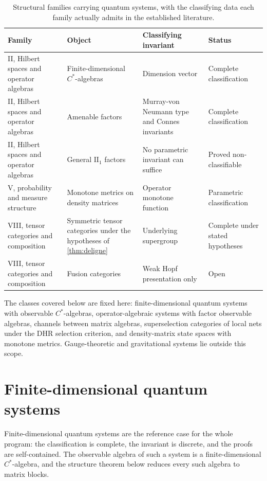 \documentclass[11pt,letterpaper]{article}
\theoremstyle{definition}
\theoremstyle{remark}
\begin{document}
\begin{table}[ht]
\centering
\caption{Structural families carrying quantum systems, with the classifying data each family actually admits in the established literature.}
\label{tab:families}
\small
\begin{tabularx}{\textwidth}{@{}Y Y Y Y@{}}
\toprule
Family & Object & Classifying invariant & Status \\
\midrule
II, Hilbert spaces and operator algebras & Finite-dimensional $C^*$-algebras & Dimension vector & Complete classification \\
II, Hilbert spaces and operator algebras & Amenable factors & Murray-von Neumann type and Connes invariants & Complete classification \\
II, Hilbert spaces and operator algebras & General $\mathrm{II}_1$ factors & No parametric invariant can suffice & Proved non-classifiable \\
V, probability and measure structure & Monotone metrics on density matrices & Operator monotone function & Parametric classification \\
VIII, tensor categories and composition & Symmetric tensor categories under the hypotheses of \cref{thm:deligne} & Underlying supergroup & Complete under stated hypotheses \\
VIII, tensor categories and composition & Fusion categories & Weak Hopf presentation only & Open \\
\bottomrule
\end{tabularx}
\end{table}

The classes covered below are fixed here: finite-dimensional quantum systems with observable $C^*$-algebras, operator-algebraic systems with factor observable algebras, channels between matrix algebras, superselection categories of local nets under the DHR selection criterion, and density-matrix state spaces with monotone metrics. Gauge-theoretic and gravitational systems lie outside this scope.

\section{Finite-dimensional quantum systems}
\label{sec:findim}

Finite-dimensional quantum systems are the reference case for the whole program: the classification is complete, the invariant is discrete, and the proofs are self-contained. The observable algebra of such a system is a finite-dimensional $C^*$-algebra, and the structure theorem below reduces every such algebra to matrix blocks.
\end{document}
